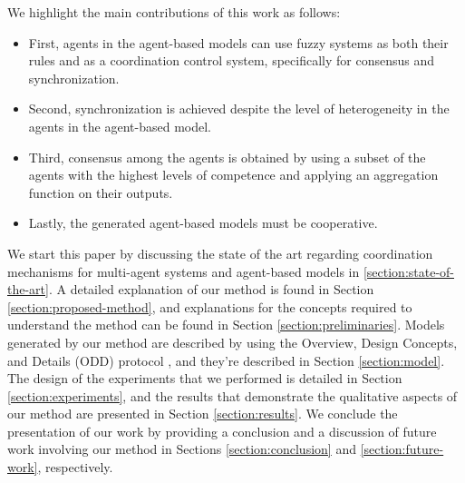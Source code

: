 We highlight the main contributions of this work as follows:
\begin{itemize}
\item First, agents in the agent-based models can use fuzzy systems as
both their rules and as a coordination control system, specifically
for consensus and synchronization.
\item Second, synchronization is achieved despite the level of
heterogeneity in the agents in the agent-based model.
\item Third, consensus among the agents is obtained by using a subset
of the agents with the highest levels of competence and applying an
aggregation function on their outputs.
\item Lastly, the generated agent-based models must be cooperative.
\end{itemize}

We start this paper by discussing the state of the art regarding
coordination mechanisms for multi-agent systems and agent-based models
in \ref{section:state-of-the-art}. A detailed explanation of our
method is found in Section \ref{section:proposed-method}, and
explanations for the concepts required to understand the method can be
found in Section \ref{section:preliminaries}. Models generated by our
method are described by using the Overview, Design Concepts, and
Details (ODD) protocol \cite{Grimm2020}, and they're described in
Section \ref{section:model}. The design of the experiments that we
performed is detailed in Section \ref{section:experiments}, and the
results that demonstrate the qualitative aspects of our method are
presented in Section \ref{section:results}. We conclude the
presentation of our work by providing a conclusion and a discussion of
future work involving our method in Sections \ref{section:conclusion}
and \ref{section:future-work}, respectively.